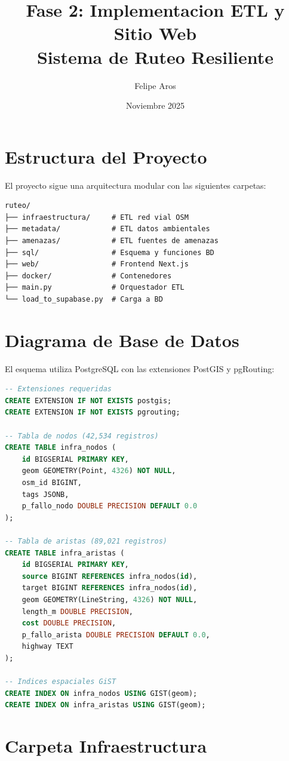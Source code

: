 \documentclass[12pt,a4paper]{article}
\title{Fase 2: Implementacion ETL y Sitio Web\\Sistema de Ruteo Resiliente}
\author{Felipe Aros}
\date{Noviembre 2025}
\begin{document}
\maketitle

\section{Estructura del Proyecto}

El proyecto sigue una arquitectura modular con las siguientes carpetas:

\begin{verbatim}
ruteo/
├── infraestructura/     # ETL red vial OSM
├── metadata/            # ETL datos ambientales
├── amenazas/            # ETL fuentes de amenazas
├── sql/                 # Esquema y funciones BD
├── web/                 # Frontend Next.js
├── docker/              # Contenedores
├── main.py              # Orquestador ETL
└── load_to_supabase.py  # Carga a BD
\end{verbatim}

\section{Diagrama de Base de Datos}

El esquema utiliza PostgreSQL con las extensiones PostGIS y pgRouting:

\begin{lstlisting}[language=SQL]
-- Extensiones requeridas
CREATE EXTENSION IF NOT EXISTS postgis;
CREATE EXTENSION IF NOT EXISTS pgrouting;

-- Tabla de nodos (42,534 registros)
CREATE TABLE infra_nodos (
    id BIGSERIAL PRIMARY KEY,
    geom GEOMETRY(Point, 4326) NOT NULL,
    osm_id BIGINT,
    tags JSONB,
    p_fallo_nodo DOUBLE PRECISION DEFAULT 0.0
);

-- Tabla de aristas (89,021 registros)
CREATE TABLE infra_aristas (
    id BIGSERIAL PRIMARY KEY,
    source BIGINT REFERENCES infra_nodos(id),
    target BIGINT REFERENCES infra_nodos(id),
    geom GEOMETRY(LineString, 4326) NOT NULL,
    length_m DOUBLE PRECISION,
    cost DOUBLE PRECISION,
    p_fallo_arista DOUBLE PRECISION DEFAULT 0.0,
    highway TEXT
);

-- Indices espaciales GiST
CREATE INDEX ON infra_nodos USING GIST(geom);
CREATE INDEX ON infra_aristas USING GIST(geom);
\end{lstlisting}

\section{Carpeta Infraestructura}
\end{document}
